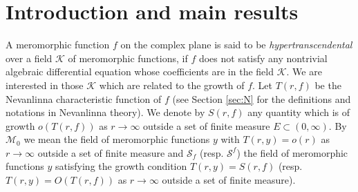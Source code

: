 \documentclass[reqno,12pt]{amsart}
\begin{document}









\maketitle

\section{Introduction and main results}\label{sec:I}

A meromorphic function $f$ on the complex plane is said to be \emph{hypertranscendental} over a field $\mathcal{K}$ of meromorphic functions, if $f$ does not satisfy any nontrivial algebraic differential equation whose coefficients are in the field $\mathcal{K}$. 
We are interested in those $\mathcal{K}$ which are related to the growth of $f$. Let $T(r, f)$ be the Nevanlinna characteristic function of $f$ (see Section \ref{sec:N} for the definitions and notations in Nevanlinna theory). 
We denote by $S(r, f)$ any quantity  which is of growth $o(T(r, f))$ as $r\rightarrow\infty$ outside a set of finite measure $E\subset(0, \infty)$.
By $\mathcal{M}_0$ we mean the field of meromorphic functions $y$ with $T(r, y)=o(r)$ as $r\rightarrow\infty$ outside a set of finite measure 
and $\mathcal{S}_f$ (resp. $\mathcal{S}^f$) the field of meromorphic functions $y$ satisfying the growth condition $T(r, y)=S(r, f)$ (resp. $T(r, y)=O(T(r, f))$ as $r\rightarrow\infty$ outside a set of finite measure).\\
 
\end{document}
